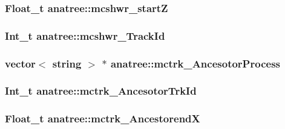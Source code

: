 \hypertarget{classanatree_af389773f10b120abbb9a3d702ee5a80f}{
\subsubsection[{mcshwr\-\_\-start\-Z}]{\setlength{\rightskip}{0pt plus 5cm}Float\-\_\-t anatree\-::mcshwr\-\_\-start\-Z}}\label{classanatree_af389773f10b120abbb9a3d702ee5a80f}
\hypertarget{classanatree_a33f6d90f5e7c3ff2e3e3c0b7a5cad3dd}{
\subsubsection[{mcshwr\-\_\-\-Track\-Id}]{\setlength{\rightskip}{0pt plus 5cm}Int\-\_\-t anatree\-::mcshwr\-\_\-\-Track\-Id}}\label{classanatree_a33f6d90f5e7c3ff2e3e3c0b7a5cad3dd}
\hypertarget{classanatree_a39f3ac00257d23e09c7d76ab850f7df5}{
\subsubsection[{mctrk\-\_\-\-Ancesotor\-Process}]{\setlength{\rightskip}{0pt plus 5cm}vector$<$ string $>$ $\ast$ anatree\-::mctrk\-\_\-\-Ancesotor\-Process}}\label{classanatree_a39f3ac00257d23e09c7d76ab850f7df5}
\hypertarget{classanatree_adcdd8a3026ca8feb1817c4438058eb47}{
\subsubsection[{mctrk\-\_\-\-Ancesotor\-Trk\-Id}]{\setlength{\rightskip}{0pt plus 5cm}Int\-\_\-t anatree\-::mctrk\-\_\-\-Ancesotor\-Trk\-Id}}\label{classanatree_adcdd8a3026ca8feb1817c4438058eb47}
\hypertarget{classanatree_ad6a37768e8fb4d82160dda13fd74f034}{
\subsubsection[{mctrk\-\_\-\-Ancestorend\-X}]{\setlength{\rightskip}{0pt plus 5cm}Float\-\_\-t anatree\-::mctrk\-\_\-\-Ancestorend\-X}}\label{classanatree_ad6a37768e8fb4d82160dda13fd74f034}

